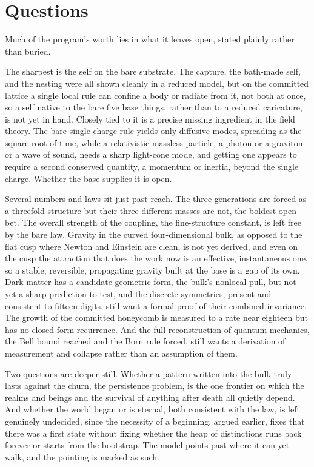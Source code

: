 \section{Questions}

Much of the program's worth lies in what it leaves open, stated plainly rather than buried.

The sharpest is the self on the bare substrate. The capture, the bath-made self, and the nesting were all shown cleanly in a reduced model, but on the committed lattice a single local rule can confine a body or radiate from it, not both at once, so a self native to the bare five base things, rather than to a reduced caricature, is not yet in hand. Closely tied to it is a precise missing ingredient in the field theory. The bare single-charge rule yields only diffusive modes, spreading as the square root of time, while a relativistic massless particle, a photon or a graviton or a wave of sound, needs a sharp light-cone mode, and getting one appears to require a second conserved quantity, a momentum or inertia, beyond the single charge. Whether the base supplies it is open.

Several numbers and laws sit just past reach. The three generations are forced as a threefold structure but their three different masses are not, the boldest open bet. The overall strength of the coupling, the fine-structure constant, is left free by the bare law. Gravity in the curved four-dimensional bulk, as opposed to the flat cusp where Newton and Einstein are clean, is not yet derived, and even on the cusp the attraction that does the work now is an effective, instantaneous one, so a stable, reversible, propagating gravity built at the base is a gap of its own. Dark matter has a candidate geometric form, the bulk's nonlocal pull, but not yet a sharp prediction to test, and the discrete symmetries, present and consistent to fifteen digits, still want a formal proof of their combined invariance. The growth of the committed honeycomb is measured to a rate near eighteen but has no closed-form recurrence. And the full reconstruction of quantum mechanics, the Bell bound reached and the Born rule forced, still wants a derivation of measurement and collapse rather than an assumption of them.

Two questions are deeper still. Whether a pattern written into the bulk truly lasts against the churn, the persistence problem, is the one frontier on which the realms and beings and the survival of anything after death all quietly depend. And whether the world began or is eternal, both consistent with the law, is left genuinely undecided, since the necessity of a beginning, argued earlier, fixes that there was a first state without fixing whether the heap of distinctions runs back forever or starts from the bootstrap. The model points past where it can yet walk, and the pointing is marked as such.


